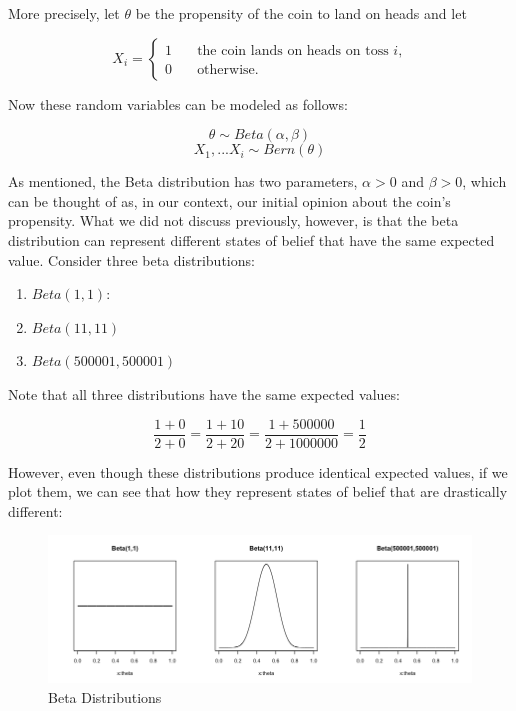 More precisely, let \(\theta\) be the propensity of the coin to land on
heads and let

\[
X_i =
\begin{cases}
   1       & \quad \text{the coin lands on heads on toss $i$,}\\
   0 & \quad \text{otherwise.}
 \end{cases}\]

Now these random variables can be modeled as follows:

\[\theta \sim Beta(\alpha, \beta)\] \[X_1,...X_i \sim Bern(\theta)\]

As mentioned, the Beta distribution has two parameters, \(\alpha>0\) and
\(\beta>0\), which can be thought of as, in our context, our initial
opinion about the coin's propensity. What we did not discuss previously,
however, is that the beta distribution can represent different states of
belief that have the same expected value. Consider three beta
distributions:

\begin{enumerate}
\def\labelenumi{\arabic{enumi}.}
\tightlist
\item
  \(Beta(1,1)\):
\item
  \(Beta(11,11)\)
\item
  \(Beta(500001,500001)\)
\end{enumerate}

\noindent Note that all three distributions have the same expected
values:

\[\frac{1 + 0}{2 + 0}=\frac{1 + 10}{2 + 20}=\frac{1 + 500000}{2 + 1000000}=\frac{1}{2}\]

\noindent However, even though these distributions produce identical
expected values, if we plot them, we can see that how they represent
states of belief that are drastically different:

\begin{figure}
\centering
\includegraphics[scale=.5]{beta}
\caption{Beta Distributions}
\label{fig:differentbeta}
\end{figure}

